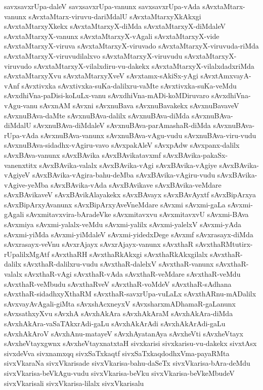 {savxsavxrUpa-daleV
savxsavxrUpa-vanunx
savxsavxrUpa-vAda
sAvxtaMtarx-vanunx
sAvxtaMtarx-viruvu-dariMdalU
sAvxtaMtarxyXkAkxgi
sAvxtaMtarxyXkekx
sAvxtaMtarxyX-diMda
sAvxtaMtarxyX-diMdaleV
sAvxtaMtarxyX-vanunx
sAvxtaMtarxyX-vAgali
sAvxtaMtarxyX-vide
sAvxtaMtarxyX-viruva
sAvxtaMtarxyX-viruvado
sAvxtaMtarxyX-viruvuda-riMda
sAvxtaMtarxyX-viruvudilalxvo
sAvxtaMtarxyX-viruvudu
sAvxtaMtarxyX-viruvudo
sAvxtaMtarxyX-vilalxdiru-vu-dakekx
sAvxtaMtarxyX-vilalxdadxriMda
sAvxtaMtarxyXvu
sAvxtaMtarxyXveV
sAvxtamx-sAkiSx-yAgi
sAvxtAmxvayA-vAnf
sAvxtivxka
sAvxtivxka-suKa-dalilxru-vaMte
sAvxtivxka-suKa-veMdu
sAvxdhiVna-paDisi-koLuLx-vanu
sAvxdhiVna-mADi-koMDiruvaro
sAvxdhiVna-vAgu-vanu
sAvxnAM
sAvxni
sAvxnuBava
sAvxnuBavakekx
sAvxnuBavaveV
sAvxnuBAva-daMte
sAvxnuBAva-dalilx
sAvxnuBAva-diMda
sAvxnuBAva-diMdalU
sAvxnuBAva-diMdaleV
sAvxnuBAva-parAmashaR-diMda
sAvxnuBAva-rUpa-vAda
sAvxnuBAva-vanunx
sAvxnuBAva-vAgu-vudu
sAvxnuBAva-viru-vudu
sAvxnuBAva-sidadhx-vAgiru-vavo
sAvxpakAleV
sAvxpAdw
sAvxpanx-dalilx
sAvxBAva-vanunx
sAvxBAvika
sAvxBAvikatavxmf
sAvxBAvika-pakaSx-vanenxtitx
sAvxBAvika-valalx
sAvxBAvika-vAgi
sAvxBAvika-vAgiye
sAvxBAvika-vAgiyeV
sAvxBAvika-vAgira-bahu-deMba
sAvxBAvika-vAgiru-vudu
sAvxBAvika-vAgive-yeMba
sAvxBAvika-vAda
sAvxBAvikave
sAvxBAvika-veMdare
sAvxBAvikaveV
sAvxBAvikAlayakekx
sAvxBAvayx
sAvxBAvAyxtf
sAvxBipArxya
sAvxBipArxyAvanunx
sAvxBipArxyAveVneMdare
sAvxmi
sAvxmi-gaLa
sAvxmi-gAgali
sAvxmitavxvira-bAradeVke
sAvxmitavxvu
sAvxmitavxvU
sAvxmi-BAva
sAvxmiya
sAvxmi-yalalx-veMdu
sAvxmi-yalilx
sAvxmi-yalelxV
sAvxmi-yAda
sAvxmi-yiMda
sAvxmi-yiMdaleV
sAvxmi-yidedxDege
sAvxmf
sAvxrasayx-diMda
sAvxrasayx-veVnu
sAvxrAjayx
sAvxrAjayx-vanunx
sAvxthaR
sAvxthaRMtutirx-rUpalilxMgAtf
sAvxthaRH
sAvxthaRkAkxgi
sAvxthaRkAkxgilalx
sAvxthaR-dalilx
sAvxthaR-dalilxru-vudu
sAvxthaR-dalelxV
sAvxthaR-vanunx
sAvxthaR-valalx
sAvxthaR-vAgi
sAvxthaR-vAda
sAvxthaR-veMdare
sAvxthaR-veMdu
sAvxthaR-veMbudu
sAvxthaRveV
sAvxthaR-voMdeV
sAvxthaR-sAdhana
sAvxthaR-sidadhxyXthaRM
sAvxthaR-savxrUpa-vuLaLx
sAvxthARnu-mADalilx
sAvxvayAvAgali-giMta
sAvxshAcxneyxV
sAvxsharxmADhamaR-gaLanunx
sAvxsathxyXvu
sAvxhA
sAvxhAkAra
sAvxhAkAraM
sAvxhAkAra-diMda
sAvxhAkAra-vaSaTAkxrAdi-gaLu
sAvxhAkArAdi
sAvxhAkArAdi-gaLu
sAvxhAkAroV
sAvxhAnu-matayeV
sAvxhAyatanAya
sAvxheVti
sAvxheVtayx
sAvxheVtayxgwnx
sAvxheVtayxnatxtaH
sivxkarisi
sivxkarisu-vu-dakekx
sivxtAsx
sivxdeVva
sivxnamxqq
sivxSaTxkaqtf
sivxSaTxkaqdodhxVma-payaRMta
sivxVkaraNa
sivxVkarisade
sivxVkarisa-bahu-daSeTx
sivxVkarisa-bAra-deMdu
sivxVkarisa-beVkAgu-vudu
sivxVkarisa-beVku
sivxVkarisa-beVkeMbudeV
sivxVkarisali
sivxVkarisa-lilalx
sivxVkarisalu
}
